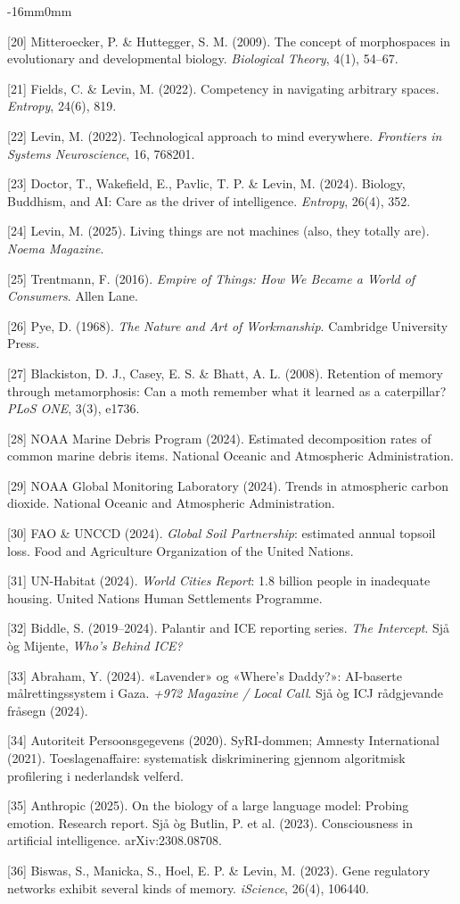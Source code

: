 \documentclass[10pt,oneside]{book}
\newcommand{\refentry}[1]{%
  \par\addvspace{0pt}%
  \begingroup\footnotesize\linespread{0.92}\selectfont
  \noindent\hangindent=4mm\hangafter=1 #1\par%
  \endgroup
}
\newenvironment{widebody}{%
  \begin{adjustwidth}{-16mm}{0mm}%
}{%
  \end{adjustwidth}%
}
\begin{document}
\begin{widebody}
\refentry{[20] Mitteroecker, P. \& Huttegger, S. M. (2009). The concept of morphospaces in evolutionary and developmental biology. \textit{Biological Theory}, 4(1), 54--67.}
\refentry{[21] Fields, C. \& Levin, M. (2022). Competency in navigating arbitrary spaces. \textit{Entropy}, 24(6), 819.}
\refentry{[22] Levin, M. (2022). Technological approach to mind everywhere. \textit{Frontiers in Systems Neuroscience}, 16, 768201.}
\refentry{[23] Doctor, T., Wakefield, E., Pavlic, T. P. \& Levin, M. (2024). Biology, Buddhism, and AI: Care as the driver of intelligence. \textit{Entropy}, 26(4), 352.}
\refentry{[24] Levin, M. (2025). Living things are not machines (also, they totally are). \textit{Noema Magazine}.}
\refentry{[25] Trentmann, F. (2016). \textit{Empire of Things: How We Became a World of Consumers}. Allen Lane.}
\refentry{[26] Pye, D. (1968). \textit{The Nature and Art of Workmanship}. Cambridge University Press.}
\refentry{[27] Blackiston, D. J., Casey, E. S. \& Bhatt, A. L. (2008). Retention of memory through metamorphosis: Can a moth remember what it learned as a caterpillar? \textit{PLoS ONE}, 3(3), e1736.}
\refentry{[28] NOAA Marine Debris Program (2024). Estimated decomposition rates of common marine debris items. National Oceanic and Atmospheric Administration.}
\refentry{[29] NOAA Global Monitoring Laboratory (2024). Trends in atmospheric carbon dioxide. National Oceanic and Atmospheric Administration.}
\refentry{[30] FAO \& UNCCD (2024). \textit{Global Soil Partnership}: estimated annual topsoil loss. Food and Agriculture Organization of the United Nations.}
\refentry{[31] UN-Habitat (2024). \textit{World Cities Report}: 1.8 billion people in inadequate housing. United Nations Human Settlements Programme.}
\refentry{[32] Biddle, S. (2019--2024). Palantir and ICE reporting series. \textit{The Intercept}. Sjå òg Mijente, \textit{Who's Behind ICE?}}
\refentry{[33] Abraham, Y. (2024). «Lavender» og «Where's Daddy?»: AI-baserte målrettingssystem i Gaza. \textit{+972 Magazine / Local Call}. Sjå òg ICJ rådgjevande fråsegn (2024).}
\refentry{[34] Autoriteit Persoonsgegevens (2020). SyRI-dommen; Amnesty International (2021). Toeslagenaffaire: systematisk diskriminering gjennom algoritmisk profilering i nederlandsk velferd.}
\refentry{[35] Anthropic (2025). On the biology of a large language model: Probing emotion. Research report. Sjå òg Butlin, P. et al. (2023). Consciousness in artificial intelligence. arXiv:2308.08708.}
\refentry{[36] Biswas, S., Manicka, S., Hoel, E. P. \& Levin, M. (2023). Gene regulatory networks exhibit several kinds of memory. \textit{iScience}, 26(4), 106440.}

\end{widebody}
\end{document}
